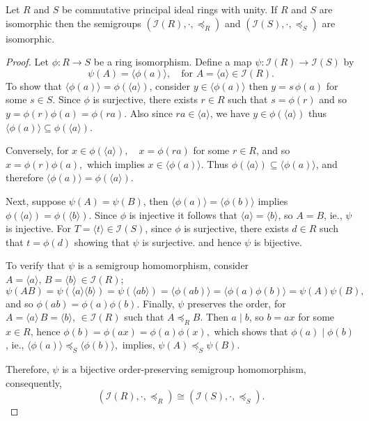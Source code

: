 \documentclass[10pt,a4paper]{amsart}
\begin{document}
\begin{theorem}
	Let $R$ and $S$ be commutative principal ideal rings with unity.
	If $R$ and $S$ are isomorphic then the semigroups
	$(\mathcal{I}(R), \cdot , \preccurlyeq_{R})$ and
	$(\mathcal{I}(S), \cdot , \preccurlyeq_{S})$ are isomorphic.
\end{theorem}

\begin{proof}
	Let $\phi \colon R \to S$ be a ring isomorphism. Define a map 
	$\psi \colon \mathcal{I}(R) \to \mathcal{I}(S)$ by
	\[
	\psi(A) = \langle \phi(a) \rangle , \quad \text{for } A = \langle a \rangle \in \mathcal{I}(R).
	\]
	To show that $\langle \phi(a) \rangle = \phi(\langle a \rangle)$, consider 
	$y \in \langle \phi(a) \rangle$  then $y = s\,\phi(a)$ for some $s \in S$. 
	Since $\phi$ is surjective, there exists $r \in R$ such that $s = \phi(r)$ and so 
	$y = \phi(r)\phi(a) = \phi(ra).$ Also since $ra \in \langle a \rangle$, we have $y \in \phi(\langle a \rangle)$  thus $\langle \phi(a) \rangle \subseteq \phi(\langle a \rangle)$.
	
	Conversely, for $x \in \phi(\langle a \rangle),\quad x = \phi(ra)$ for some $r \in R$, and so $	x = \phi(r)\phi(a),$
	which implies $x \in \langle \phi(a) \rangle$. Thus 
	$\phi(\langle a \rangle) \subseteq \langle \phi(a) \rangle$, and therefore
$	\langle \phi(a) \rangle = \phi(\langle a \rangle).$
	
	Next, suppose $\psi(A) = \psi(B)$, then
$	\langle \phi(a) \rangle = \langle \phi(b) \rangle$
	implies $\phi(\langle a \rangle) = \phi(\langle b \rangle)$. 
	Since $\phi$ is injective it follows that $\langle a \rangle = \langle b \rangle$, 
	so $A = B$, ie., $\psi$ is injective. For $T = \langle t \rangle \in \mathcal{I}(S)$, 
	since $\phi$ is surjective, there exists $d \in R$ such that $t = \phi(d)$
	showing that $\psi$ is surjective. and hence $\psi$ is bijective.
	
	To verify that $\psi$ is a semigroup homomorphism, consider $A = \langle a \rangle,\, B = \langle b \rangle\, \in \mathcal{I}(R)$; 
	\[
	\psi(AB)
	= \psi(\langle a \rangle \langle b \rangle)
	= \psi(\langle ab \rangle)
	= \langle \phi(ab) \rangle
	= \langle \phi(a)\phi(b) \rangle
	= \psi(A)\psi(B),
	\]
	and so $\phi(ab) = \phi(a)\phi(b)$.
	Finally, $\psi$ preserves the order, for $A = \langle a \rangle\, B = \langle b \rangle,\, \in \mathcal{I}(R)$ such that 
	$A \preccurlyeq_R B$. Then $a \mid b$, so $b = ax$ for some $x \in R$, hence $\phi(b) = \phi(ax) = \phi(a)\phi(x),$
	which shows that $\phi(a) \mid \phi(b)$, ie., $	\langle \phi(a) \rangle \preccurlyeq_S \langle \phi(b) \rangle,$ implies, $\psi(A) \preccurlyeq_S \psi(B).$
	
	Therefore, $\psi$ is a bijective order-preserving semigroup homomorphism, consequently,
	\[
	(\mathcal{I}(R), \cdot, \preccurlyeq_R)
	\cong
	(\mathcal{I}(S), \cdot, \preccurlyeq_S).
	\]
\end{proof}
\end{document}

